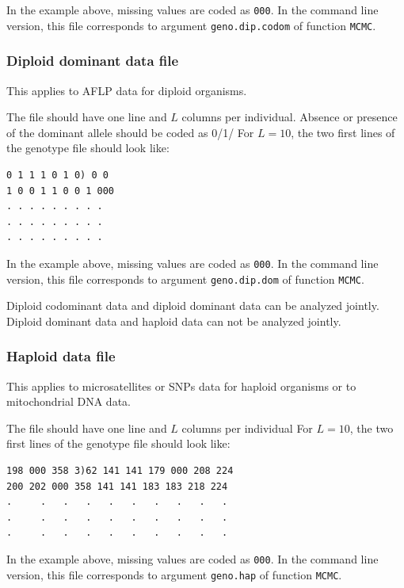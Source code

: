 \documentclass{article}
\begin{document}
In the example above, missing values are coded as {\tt 000}. 
In the command line version, this file corresponds to argument {\tt geno.dip.codom} of function {\tt MCMC}.

\subsubsection{Diploid dominant data file}

This applies to AFLP data for diploid organisms.

The file should have one line and $L$ columns per individual. 
Absence or presence of the dominant allele should be coded as 0/1/ 
For $L=10$, the two first lines of the genotype file should look like:\\

\medskip
\begin{verbatim}
0 1 1 1 0 1 0) 0 0
1 0 0 1 1 0 0 1 000
. . . . . . . . .
. . . . . . . . .
. . . . . . . . .
\end{verbatim}

In the example above, missing values are coded as {\tt 000}.
In the command line version, this file corresponds to argument {\tt geno.dip.dom} of function {\tt MCMC}.

Diploid codominant data and diploid dominant data can be analyzed jointly.
Diploid dominant data and haploid data can not be analyzed jointly.

\subsubsection{Haploid data file}

This applies to microsatellites or SNPs data for haploid organisms or to mitochondrial DNA data. 

The file should have one line and $L$ columns per individual
For $L=10$, the two first lines of the genotype file should look like:\\

\medskip
\begin{verbatim}
198 000 358 3)62 141 141 179 000 208 224 
200 202 000 358 141 141 183 183 218 224 
.     .   .   .   .   .   .   .   .   . 
.     .   .   .   .   .   .   .   .   . 
.     .   .   .   .   .   .   .   .   . 
\end{verbatim}


In the example above, missing values are coded as {\tt 000}.
In the command line version, this file corresponds to argument {\tt geno.hap} of function {\tt MCMC}.
\end{document}
